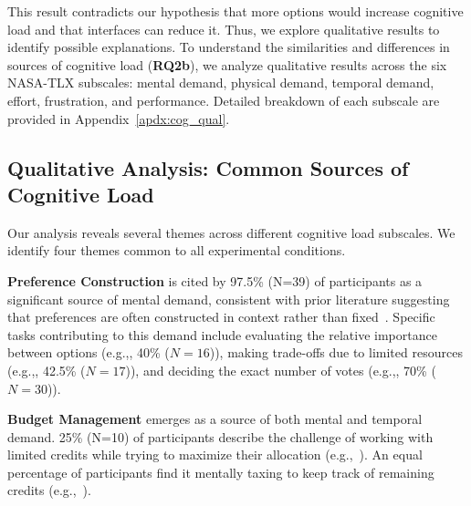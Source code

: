 This result contradicts our hypothesis that more options would increase cognitive load and that interfaces can reduce it. Thus, we explore qualitative results to identify possible explanations. To understand the similarities and differences in sources of cognitive load (\textbf{RQ2b}), we analyze qualitative results across the six NASA-TLX subscales: mental demand, physical demand, temporal demand, effort, frustration, and performance. Detailed breakdown of each subscale are provided in Appendix~\ref{apdx:cog_qual}.

\subsection{Qualitative Analysis: Common Sources of Cognitive Load}
\label{sec:cog_common}
Our analysis reveals several themes across different cognitive load subscales. We identify four themes common to all experimental conditions.

\textbf{Preference Construction} is cited by 97.5\% (N=39) of participants as a significant source of mental demand, consistent with prior literature suggesting that preferences are often constructed in context rather than fixed~\cite{lichtensteinConstructionPreference2006}. Specific tasks contributing to this demand include evaluating the relative importance between options (e.g.,, 40\% ($N=16$)), making trade-offs due to limited resources (e.g.,, 42.5\% ($N=17$)), and deciding the exact number of votes (e.g.,, 70\% ($N=30$)).

\textbf{Budget Management} emerges as a source of both mental and temporal demand. 25\% (N=10) of participants describe the challenge of working with limited credits while trying to maximize their allocation (e.g.,~). An equal percentage of participants find it mentally taxing to keep track of remaining credits (e.g.,~).

